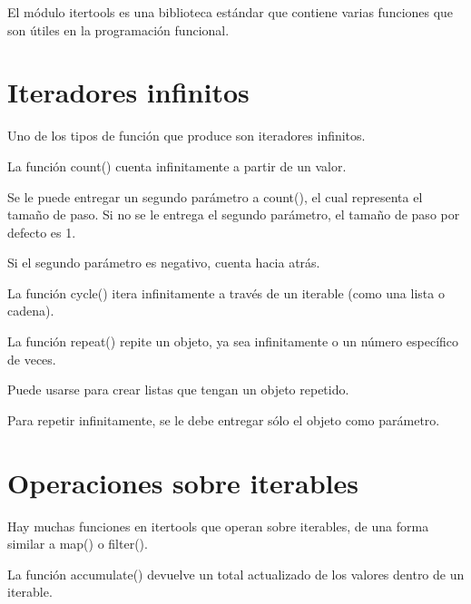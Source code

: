 \documentclass{report}
\begin{document}
{El módulo itertools es una biblioteca estándar que contiene varias funciones que son útiles en la programación funcional.


\section{Iteradores infinitos}

Uno de los tipos de función que produce son iteradores infinitos.

La función count() cuenta infinitamente a partir de un valor.


Se le puede entregar un segundo parámetro a count(), el cual representa el tamaño de paso. Si no se le entrega el segundo parámetro, el tamaño de paso por defecto es 1.


Si el segundo parámetro es negativo, cuenta hacia atrás.


La función cycle() itera infinitamente a través de un iterable (como una lista o cadena).



La función repeat() repite un objeto, ya sea infinitamente o un número específico de veces.


Puede usarse para crear listas que tengan un objeto repetido.


Para repetir infinitamente, se le debe entregar sólo el objeto como parámetro.


\section{Operaciones sobre iterables}

Hay muchas funciones en itertools que operan sobre iterables, de una forma similar a map() o filter().

La función accumulate() devuelve un total actualizado de los valores dentro de un iterable.

}
\end{document}

